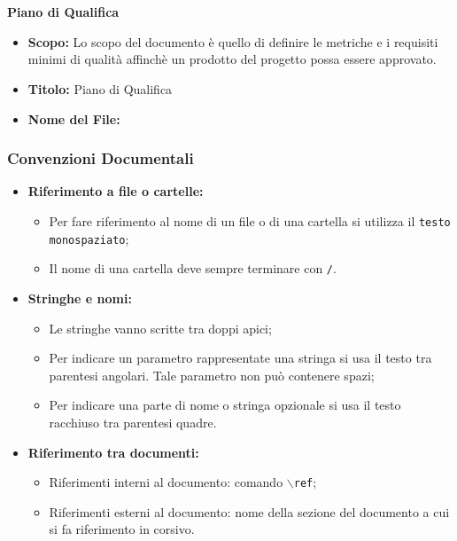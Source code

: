 \documentclass[a4paper, 12pt]{article}
\begin{document}
\paragraph{}\\
\textbf{Piano di Qualifica}
\begin{itemize}
    \item \textbf{Scopo:} Lo scopo del documento è quello di definire le metriche e i requisiti minimi di qualità affinchè un prodotto del progetto possa essere approvato.
    \item \textbf{Titolo:} Piano di Qualifica
    \item \textbf{Nome del File:} 
\end{itemize}
\subsubsection{Convenzioni Documentali}
\begin{itemize}
    \item \textbf{Riferimento a file o cartelle:}
    \begin{itemize}
        \item Per fare riferimento al nome di un file o di una cartella si utilizza il \texttt{testo monospaziato};
        \item Il nome di una cartella deve sempre terminare con \texttt{/}.
    \end{itemize}
    \item \textbf{Stringhe e nomi:}
    \begin{itemize}
        \item Le stringhe vanno scritte tra doppi apici;
        \item Per indicare un parametro rappresentate una stringa si usa il testo tra parentesi angolari. Tale parametro non può contenere spazi;
        \item Per indicare una parte di nome o stringa opzionale si usa il testo racchiuso tra parentesi quadre.
    \end{itemize}
    \item \textbf{Riferimento tra documenti:}
    \begin{itemize}
        \item Riferimenti interni al documento: comando \texttt{$\backslash$ref};
        \item Riferimenti esterni al documento: nome della sezione del documento a cui si fa riferimento in corsivo.
    \end{itemize}
\end{itemize}
\end{document}
